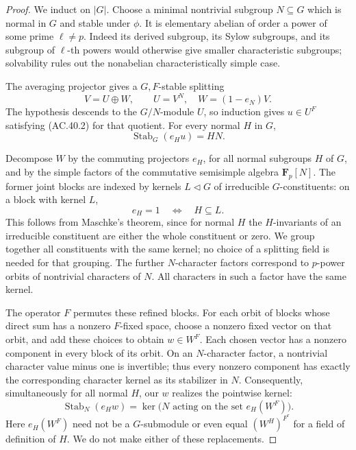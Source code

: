 \begin{proof}
We induct on \(|G|\). Choose a minimal nontrivial subgroup
\(N\subseteq G\) which is normal in \(G\) and stable under
\(\phi\). It is elementary abelian of order a power of
some prime \(\ell\ne p\). Indeed its derived subgroup,
its Sylow subgroups, and its subgroup of \(\ell\)-th
powers would otherwise give smaller characteristic
subgroups; solvability rules out the nonabelian
characteristically simple case.

The averaging projector gives a \(G,F\)-stable splitting
\[
                         V=U\oplus W,\qquad
                         U=V^N,\quad W=(1-e_N)V.
\]
The hypothesis descends to the \(G/N\)-module \(U\),
so induction gives \(u\in U^F\) satisfying (AC.40.2)
for that quotient. For every normal \(H\) in \(G\),
\[
                         \operatorname{Stab}_G(e_Hu)=HN.
                         \tag{AC.40.3}
\]

Decompose \(W\) by the commuting projectors \(e_H\),
for all normal subgroups \(H\) of \(G\), and by the
simple factors of the commutative semisimple algebra
\(\mathbf F_p[N]\). The former joint blocks are
indexed by kernels \(L\triangleleft G\) of irreducible
\(G\)-constituents: on a block with kernel \(L\),
\[
                         e_H=1\quad\Longleftrightarrow\quad H\subseteq L.
\]
This follows from Maschke's theorem, since for normal
\(H\) the \(H\)-invariants of an irreducible constituent
are either the whole constituent or zero. We group
together all constituents with the same kernel; no
choice of a splitting field is needed for that grouping.
The further \(N\)-character factors correspond to
\(p\)-power orbits of nontrivial characters of \(N\).
All characters in such a factor have the same kernel.

The operator \(F\) permutes these refined blocks.
For each orbit of blocks whose direct sum has a
nonzero \(F\)-fixed space, choose a nonzero fixed
vector on that orbit, and add these choices to obtain
\(w\in W^F\). Each chosen vector has a nonzero component
in every block of its orbit. On an \(N\)-character
factor, a nontrivial character value minus one is
invertible; thus every nonzero component has exactly
the corresponding character kernel as its stabilizer
in \(N\). Consequently, simultaneously for all normal
\(H\), our \(w\) realizes the pointwise kernel:
\[
 \operatorname{Stab}_N(e_Hw)=
 \ker\bigl(N\text{ acting on the set }e_H(W^F)\bigr).
                         \tag{AC.40.4}
\]
Here \(e_H(W^F)\) need not be a \(G\)-submodule or
even equal \((W^H)^{F^r}\) for a field of definition
of \(H\). We do not make either of these replacements.


\end{proof}
